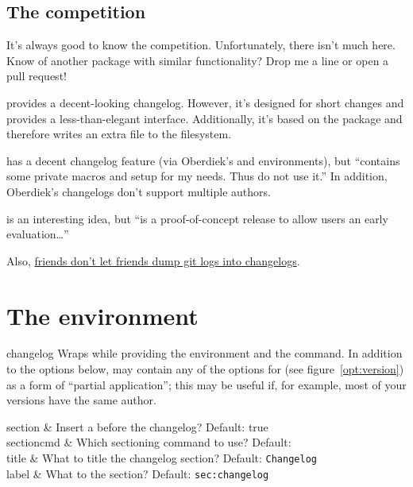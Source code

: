 \documentclass{ltxdoc}
\begin{document}
\subsection{The competition}

It's always good to know the competition. Unfortunately, there isn't much
here. Know of another package with similar functionality? Drop me a line or
open a pull request!

\begin{ctandescription}
	 provides a decent-looking changelog. However, it's
		designed for short changes and provides a less-than-elegant
		interface. Additionally, it's based on the 
		package and therefore writes an extra file to the
		filesystem.

	 has a decent changelog feature (via
		Oberdiek's  and  environments),
		but  ``contains some private macros and setup
		for my needs. Thus do not use it.'' In addition, Oberdiek's
		changelogs don't support multiple authors.

	 is an interesting idea, but  ``is a
		proof-of-concept release to allow users an early
		evaluation\dots''

		Also,
		\href{https://keepachangelog.com/en/1.0.0/}{friends don't
		let friends dump git logs into changelogs}.
\end{ctandescription}

\section{The  environment}

\begin{macro}{changelog}\AfterLastParam
Wraps  while providing the  environment and
the  command. In addition to the options below,
 may contain any of the options for  (see
figure~\ref{opt:version}) as a form of ``partial application''; this
may be useful if, for example, most of your versions have the same author.

\begin{Optionlist}
	section & Insert a  before the changelog? Default: true \\
	sectioncmd & Which sectioning command to use? Default:  \\
	title & What to title the changelog section? Default: \texttt{Changelog} \\
	label & What to  the section? Default:
	\texttt{sec:changelog} \\
\end{Optionlist}
\end{macro}
\end{document}

